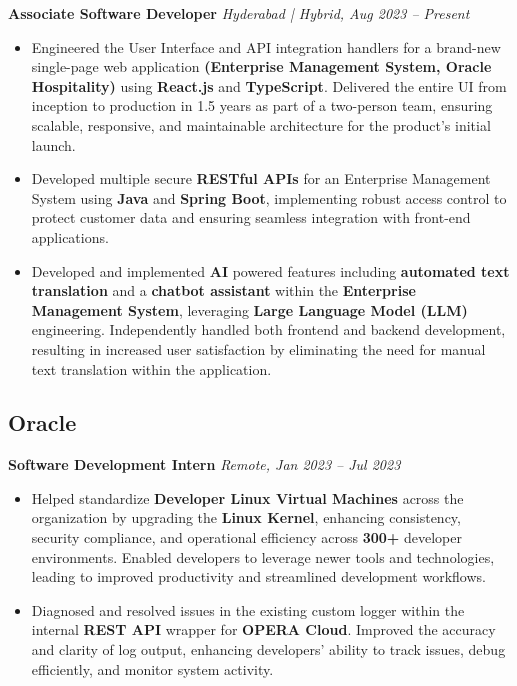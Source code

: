 \documentclass[a4paper,12pt]{article}
\begin{document}
\textbf{Associate Software Developer} \hfill \textit{Hyderabad | Hybrid, Aug 2023 -- Present}
\begin{itemize}[leftmargin=1.5em]
  \item Engineered the User Interface and API integration handlers for a brand-new single-page web application \textbf{(Enterprise Management System, Oracle Hospitality)} using \textbf{React.js} and \textbf{TypeScript}. Delivered the entire UI from inception to production in 1.5 years as part of a two-person team, ensuring scalable, responsive, and maintainable architecture for the product’s initial launch.
  \item Developed multiple secure \textbf{RESTful APIs} for an Enterprise Management System using \textbf{Java} and \textbf{Spring Boot}, implementing robust access control to protect customer data and ensuring seamless integration with front-end applications.
  \item Developed and implemented \textbf{AI} powered features including \textbf{automated text translation} and a \textbf{chatbot assistant} within the \textbf{Enterprise Management System}, leveraging \textbf{Large Language Model (LLM)} engineering. Independently handled both frontend and backend development, resulting in increased user satisfaction by eliminating the need for manual text translation within the application.
\end{itemize}

\subsection*{Oracle }
\textbf{Software Development Intern} \hfill \textit{Remote, Jan 2023 -- Jul 2023}
\begin{itemize}[leftmargin=1.5em]
  \item Helped standardize \textbf{Developer Linux Virtual Machines} across the organization by upgrading the \textbf{Linux Kernel}, enhancing consistency, security compliance, and operational efficiency across \textbf{300+} developer environments. Enabled developers to leverage newer tools and technologies, leading to improved productivity and streamlined development workflows.
  \item Diagnosed and resolved issues in the existing custom logger within the internal \textbf{REST API} wrapper for \textbf{OPERA Cloud}. Improved the accuracy and clarity of log output, enhancing developers’ ability to track issues, debug efficiently, and monitor system activity.
\end{itemize}
\end{document}
